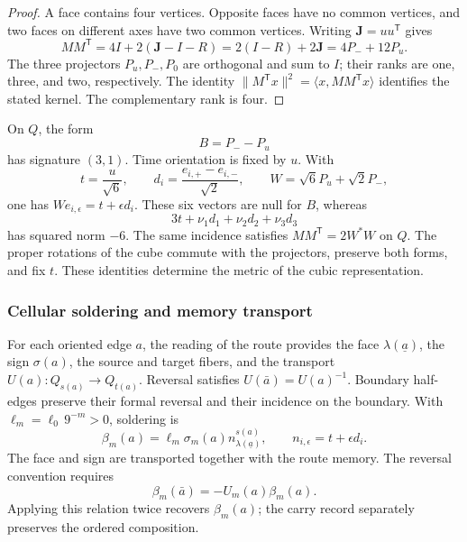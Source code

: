 \begin{proof}
A face contains four vertices. Opposite faces have no common vertices,
and two faces on different axes have two common vertices.
Writing \(\mathbf J=uu^{\mathsf T}\) gives
\[
 MM^{\mathsf T}=4I+2(\mathbf J-I-R)
 =2(I-R)+2\mathbf J=4P_-+12P_u.
\]
The three projectors \(P_u,P_-,P_0\) are orthogonal and sum to \(I\);
their ranks are one, three, and two, respectively. The identity
\(\|M^{\mathsf T}x\|^2=\langle x,MM^{\mathsf T}x\rangle\)
identifies the stated kernel. The complementary rank is four.
\end{proof}

On \(Q\), the form
\[
 B=P_--P_u
\]
has signature \((3,1)\). Time orientation is fixed by \(u\).
With
\[
 t=\frac{u}{\sqrt6},\qquad
 d_i=\frac{e_{i,+}-e_{i,-}}{\sqrt2},\qquad
 W=\sqrt6P_u+\sqrt2P_-,
\]
one has \(We_{i,\epsilon}=t+\epsilon d_i\). These six vectors
are null for \(B\), whereas
\[
 3t+\nu_1d_1+\nu_2d_2+\nu_3d_3
\]
has squared norm \(-6\). The same incidence satisfies
\(MM^{\mathsf T}=2W^*W\) on \(Q\). The proper rotations of the cube
commute with the projectors, preserve both forms, and fix \(t\).
These identities determine the metric of the cubic representation.

\subsubsection{Cellular soldering and memory transport}
\label{vii:sec:soldadura-celular}

For each oriented edge \(a\), the reading of the route provides
the face \(\lambda(\underline a)\), the sign
\(\sigma(a)\), the source and target fibers, and the transport
\(U(a):Q_{s(a)}\longrightarrow Q_{t(a)}\).
Reversal satisfies \(U(\bar a)=U(a)^{-1}\).
Boundary half-edges preserve their formal reversal and their incidence
on the boundary. With \(\ell_m=\ell_0\,9^{-m}>0\), soldering is
\begin{equation}
 \beta_m(a)=\ell_m\sigma_m(a)
              n_{\lambda(\underline a)}^{s(a)},\qquad
 n_{i,\epsilon}=t+\epsilon d_i.
 \label{vii:eq:soldadura-arista}
\end{equation}
The face and sign are transported together with the route memory.
The reversal convention requires
\begin{equation}
 \beta_m(\bar a)=-U_m(a)\beta_m(a).
 \label{vii:eq:inversion-soldadura}
\end{equation}
Applying this relation twice recovers \(\beta_m(a)\);
the carry record separately preserves the ordered composition.

